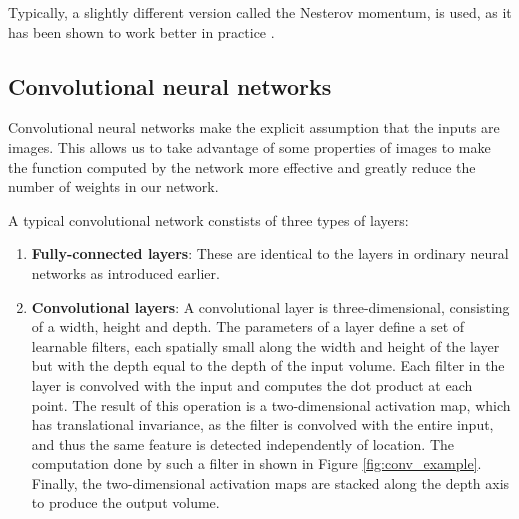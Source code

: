 \documentclass[12pt,a4paper,twoside,openright]{report}
\begin{document}
Typically, a slightly different version called the Nesterov momentum, is used, as it has been shown to work better in practice \cite{nesterov_momentum}.

\subsection{Convolutional neural networks}
Convolutional neural networks make the explicit assumption that the inputs are images. This allows us to take advantage of some properties of images to make the function computed by the network more effective and greatly reduce the number of weights in our network. 

A typical convolutional network constists of three types of layers:
\begin{enumerate}
	\item \textbf{Fully-connected layers}: These are identical to the layers in ordinary neural networks as introduced earlier.
	\item \textbf{Convolutional layers}: A convolutional layer is three-dimensional, consisting of a width, height and depth. The parameters of a layer define a set of learnable filters, each spatially small along the width and height of the layer but with the depth equal to the depth of the input volume. Each filter in the layer is convolved with the input and computes the dot product at each point. The result of this operation is a two-dimensional activation map, which has translational invariance, as the filter is convolved with the entire input, and thus the same feature is detected independently of location. The computation done by such a filter in shown in Figure \ref{fig:conv_example}. Finally, the two-dimensional activation maps are stacked along the depth axis to produce the output volume.
	

\end{enumerate}
\end{document}
